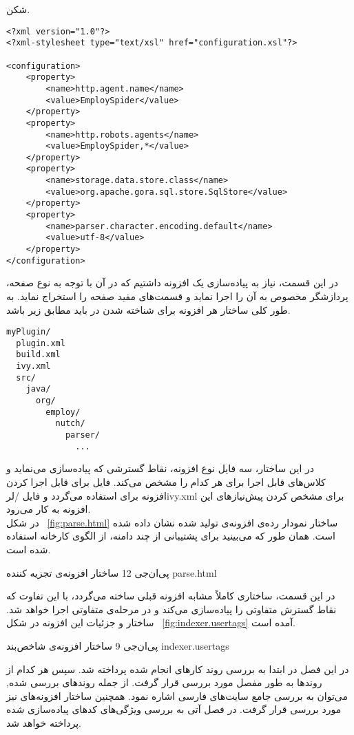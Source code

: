 ‌شکن.

\begin{latin} 
\begin{lstlisting}[style=listXML]
<?xml version="1.0"?>
<?xml-stylesheet type="text/xsl" href="configuration.xsl"?>

<configuration>
	<property>
		<name>http.agent.name</name>
		<value>EmploySpider</value>
	</property>
	<property>
		<name>http.robots.agents</name>
		<value>EmploySpider,*</value>
	</property>
	<property>
		<name>storage.data.store.class</name>
		<value>org.apache.gora.sql.store.SqlStore</value>
	</property>
	<property>
		<name>parser.character.encoding.default</name>
		<value>utf-8</value>
	</property>
</configuration>
\end{lstlisting}
\end{latin}
در این قسمت، نیاز به پیاده‌سازی یک افزونه داشتیم که در آن با توجه به نوع صفحه، پردازشگر مخصوص به آن را اجرا نماید و قسمت‌های مفید صفحه را استخراج نماید. به طور کلی ساختار هر افزونه برای شناخته شدن در  باید مطابق زیر باشد.
\begin{latin}
\begin{verbatim}
myPlugin/
  plugin.xml
  build.xml
  ivy.xml
  src/
    java/
      org/
        employ/
          nutch/
            parser/
              ...
\end{verbatim}
\end{latin}

در این ساختار، سه فایل  نوع افزونه، نقاط گسترشی که پیاده‌سازی می‌نماید و کلاس‌های قابل اجرا برای هر کدام را مشخص می‌کند. فایل  برای قابل اجرا کردن افزونه برای  استفاده می‌گردد و فایل /لر{ivy.xml} برای مشخص کردن پیش‌نیازهای این افزونه به کار می‌رود. 
\\
در شکل ~\ref {fig:parse.html} ساختار نمودار رده‌ی افزونه‌ی تولید شده نشان داده شده است. همان طور که می‌بینید برای پشتیبانی از چند دامنه، از الگوی کارخانه استفاده شده است.

‌پی‌ان‌جی {12} {ساختار افزونه‌ی تجزیه کننده} {parse.html}

در این قسمت، ساختاری کاملاً مشابه افزونه قبلی ساخته می‌گردد، با این تفاوت که نقاط گسترش متفاوتی را پیاده‌سازی می‌کند و در مرحله‌ی متفاوتی اجرا خواهد شد. ساختار و جزئیات این افزونه در شکل ~\ref {fig:indexer.usertags} آمده است.

‌پی‌ان‌جی {9} {ساختار افزونه‌ی شاخص‌بند} {indexer.usertags}

در این فصل در ابتدا به بررسی روند کارهای انجام شده پرداخته شد. سپس هر کدام از روند‌ها به طور مفصل مورد بررسی قرار گرفت. از جمله روندهای بررسی شده, می‌توان به بررسی جامع سایت‌های فارسی اشاره نمود. همچنین ساختار افزونه‌های  نیز مورد بررسی قرار گرفت. در فصل آتی به بررسی ویژگی‌های کدهای پیاده‌سازی شده پرداخته خواهد شد.
